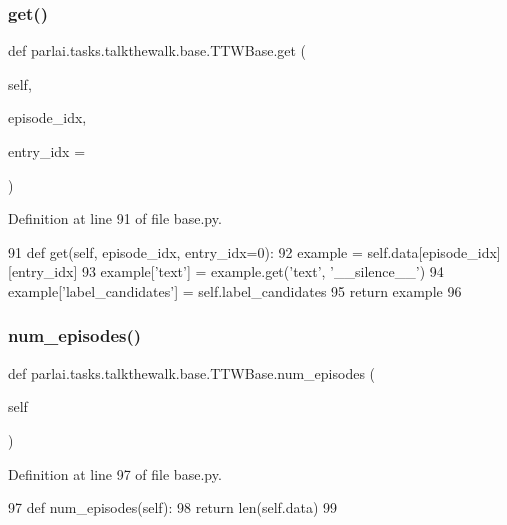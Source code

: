 \subsubsection{\texorpdfstring{get()}{get()}}
{\footnotesize\ttfamily def parlai.\+tasks.\+talkthewalk.\+base.\+T\+T\+W\+Base.\+get (\begin{DoxyParamCaption}\item[{}]{self,  }\item[{}]{episode\+\_\+idx,  }\item[{}]{entry\+\_\+idx = {} }\end{DoxyParamCaption})}



Definition at line 91 of file base.\+py.


\begin{DoxyCode}
91     \textcolor{keyword}{def }get(self, episode\_idx, entry\_idx=0):
92         example = self.data[episode\_idx][entry\_idx]
93         example[\textcolor{stringliteral}{'text'}] = example.get(\textcolor{stringliteral}{'text'}, \textcolor{stringliteral}{'\_\_silence\_\_'})
94         example[\textcolor{stringliteral}{'label\_candidates'}] = self.label\_candidates
95         \textcolor{keywordflow}{return} example
96 
\end{DoxyCode}
\mbox{\label{classparlai_1_1tasks_1_1talkthewalk_1_1base_1_1TTWBase_ab4890c4569ff31724718ed8c684e1a76}} 
\subsubsection{\texorpdfstring{num\+\_\+episodes()}{num\_episodes()}}
{\footnotesize\ttfamily def parlai.\+tasks.\+talkthewalk.\+base.\+T\+T\+W\+Base.\+num\+\_\+episodes (\begin{DoxyParamCaption}\item[{}]{self }\end{DoxyParamCaption})}



Definition at line 97 of file base.\+py.


\begin{DoxyCode}
97     \textcolor{keyword}{def }num\_episodes(self):
98         \textcolor{keywordflow}{return} len(self.data)
99 
\end{DoxyCode}
\mbox{\label{classparlai_1_1tasks_1_1talkthewalk_1_1base_1_1TTWBase_a691d7f4a22c6ea032489ea70fe5d6b35}} 
